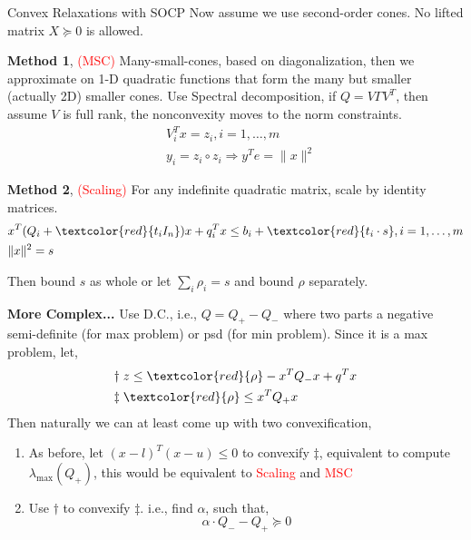 \documentclass[aspectratio=1610, 10pt]{beamer}
\newcommand{\red}[1]{\textcolor{red}{#1}}
\begin{document}
\begin{frame}[allowframebreaks]{Convex Relaxations with SOCP}
  Now assume we use second-order cones. No lifted matrix \(X \succeq 0\) is allowed.

  \textbf{Method 1}, \textcolor{red}{(MSC)} Many-small-cones, based on diagonalization, then we approximate on 1-D quadratic functions that form the many but smaller (actually 2D) smaller cones.
  Use Spectral decomposition, if \(Q = V\Gamma V^T\), then assume \(V\) is full rank, the nonconvexity moves to the norm constraints.
  \begin{equation}\label{eq:primal.msc}
    \begin{aligned}
       & V_i^Tx = z_i,i= 1,\dots, m                     \\
       & y_i = z_i \circ z_i \Rightarrow y^Te = \|x\|^2
    \end{aligned}
  \end{equation}

  \textbf{Method 2}, \textcolor{red}{(Scaling)} For any indefinite quadratic matrix, scale by identity matrices.
  \begin{equation}\label{eq:primal.scale}
    \begin{aligned}
       & x^T(Q_i+ \textcolor{red}{t_i I_n}) x+ q_i^T x \leq b_i+ \textcolor{red}{t_i \cdot s},i= 1,\dots, m \\
       & \|x\|^2= s
    \end{aligned}
  \end{equation}

  Then bound \(s\) as whole or let \(\sum_i \rho_i = s\) and bound \(\rho\) separately.
  \framebreak

  \textbf{More Complex...} Use D.C., i.e., \(Q = Q_+ - Q_-\) where two parts a negative semi-definite (for max problem) or psd (for min problem).
  Since it is a max problem, let,
  \begin{align*}
    \dagger\;  & z \le \textcolor{red}{\rho} - x^TQ_-x + q^Tx \\
    \ddagger\; & \red{\rho} \le x^TQ_+x                       \\
  \end{align*}
  Then naturally we can at least come up with two convexification,
  \begin{enumerate}
    \item As before, let \((x-l)^T(x-u) \le 0\) to convexify \(\ddagger\), equivalent to compute \(\lambda_{\max}(Q_+)\), this would be equivalent to \red{Scaling} and \red{MSC}
    \item Use \(\dagger\) to convexify \(\ddagger\). i.e., find \(\alpha\), such that,
          \begin{equation*}
            \alpha \cdot Q_- - Q_+ \succeq 0
          \end{equation*}
  \end{enumerate}


\end{frame}
\end{document}
